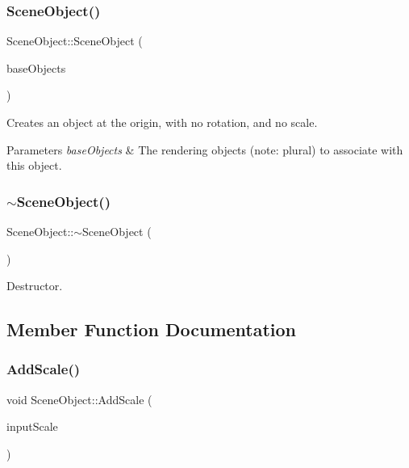 \subsubsection{\texorpdfstring{Scene\+Object()}{SceneObject()}\hspace{0.1cm}{\footnotesize\ttfamily [3/3]}}
{\footnotesize\ttfamily Scene\+Object\+::\+Scene\+Object (\begin{DoxyParamCaption}\item[{const std\+::vector$<$ std\+::shared\+\_\+ptr$<$ class \hyperlink{class_rendering_object}{Rendering\+Object} $>$$>$ \&}]{base\+Objects }\end{DoxyParamCaption})}



Creates an object at the origin, with no rotation, and no scale.


\begin{DoxyParams}{Parameters}
{\em base\+Objects} & The rendering objects (note\+: plural) to associate with this object. \\
\hline
\end{DoxyParams}
\hypertarget{class_scene_object_ab258d6b94e982d5ae71ad4d7652381f4}{}\label{class_scene_object_ab258d6b94e982d5ae71ad4d7652381f4}
\subsubsection{\texorpdfstring{$\sim$\+Scene\+Object()}{~SceneObject()}}
{\footnotesize\ttfamily Scene\+Object\+::$\sim$\+Scene\+Object (\begin{DoxyParamCaption}{ }\end{DoxyParamCaption})\hspace{0.3cm}{\ttfamily [virtual]}}



Destructor.



\subsection{Member Function Documentation}
\hypertarget{class_scene_object_a40d7194cf79cad6ee3a2fa7c3d8ed95c}{}\label{class_scene_object_a40d7194cf79cad6ee3a2fa7c3d8ed95c}
\subsubsection{\texorpdfstring{Add\+Scale()}{AddScale()}}
{\footnotesize\ttfamily void Scene\+Object\+::\+Add\+Scale (\begin{DoxyParamCaption}\item[{float}]{input\+Scale }\end{DoxyParamCaption})}



